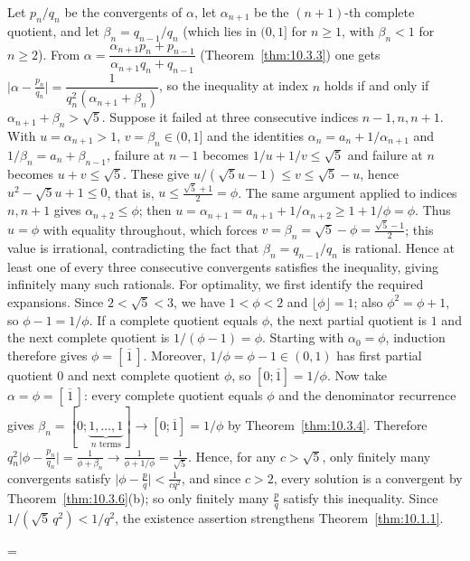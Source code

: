 \documentclass[11pt]{article}
\makeatletter
\theoremstyle{ntstyle}
\let\nt@closedisplay\]
\def\nt@guardedclose{\@ifnextchar\par{\nt@closeafterpar}{\@ifnextchar\end{\postdisplaypenalty\@M\nt@closedisplay}{\nt@closedisplay}}}
\def\nt@closeafterpar\par{\@ifnextchar\par{\nt@closeafterpar}{\@ifnextchar\end{\postdisplaypenalty\@M\nt@closedisplay\par}{\nt@closedisplay\par}}}
\renewenvironment{proof}[1][\proofname]{\par
  \pushQED{\qed}\normalfont\topsep\medskipamount\edef\nt@afterproof{\@endparpenalty=\the\@endparpenalty\relax}\@beginparpenalty\@M\@endparpenalty\@M\let\]\nt@guardedclose\trivlist\item[]\textit{#1\@addpunct{.}} \ignorespaces}{\ifvmode\addpenalty\@M\fi\popQED\nt@afterproof\endtrivlist\@endpefalse}
\makeatother
\begin{document}
\begin{proof} Let $p_n/q_n$ be the convergents of
	$\alpha$, let $\alpha_{n+1}$ be the $(n+1)$-th complete quotient, and let
	$\beta_n=q_{n-1}/q_n$ (which lies in $(0,1]$ for $n\ge1$, with
	$\beta_n<1$ for $n\ge2$). From
	$\alpha=\dfrac{\alpha_{n+1}p_n+p_{n-1}}{\alpha_{n+1}q_n+q_{n-1}}$
	(Theorem~\ref{thm:10.3.3}) one gets
	$\big|\alpha-\tfrac{p_n}{q_n}\big|=\dfrac{1}{q_n^2(\alpha_{n+1}+\beta_n)}$,
	so the inequality at index $n$ holds if and only if
	$\alpha_{n+1}+\beta_n>\sqrt{5}$. Suppose it failed at three consecutive
	indices $n-1,n,n+1$. With $u=\alpha_{n+1}>1$, $v=\beta_n\in(0,1]$
	and the identities $\alpha_n=a_n+1/\alpha_{n+1}$ and $1/\beta_n=a_n+\beta_{n-1}$,
	failure at $n-1$ becomes $1/u+1/v\le\sqrt{5}$ and failure at $n$
	becomes $u+v\le\sqrt{5}$. These give $u/(\sqrt{5}u-1)\le v\le\sqrt{5}-u$,
	hence $u^2-\sqrt{5}u+1\le0$, that is, $u\le\tfrac{\sqrt{5}+1}{2}=\phi$. The
	same argument applied to indices $n,n+1$ gives $\alpha_{n+2}\le\phi$;
	then $u=\alpha_{n+1}=a_{n+1}+1/\alpha_{n+2}\ge1+1/\phi=\phi$. Thus
	$u=\phi$ with equality throughout, which forces
	$v=\beta_n=\sqrt{5}-\phi=\tfrac{\sqrt{5}-1}{2}$; this value is irrational,
	contradicting the fact that $\beta_n=q_{n-1}/q_n$ is rational. Hence at least
	one of every three consecutive convergents satisfies the inequality,
	giving infinitely many such rationals. For optimality, we first identify the required expansions. Since
	$2<\sqrt5<3$, we have $1<\phi<2$ and $\lfloor\phi\rfloor=1$; also
	$\phi^2=\phi+1$, so $\phi-1=1/\phi$. If a complete quotient equals
	$\phi$, the next partial quotient is $1$ and the next complete quotient
	is $1/(\phi-1)=\phi$. Starting with $\alpha_0=\phi$, induction therefore
	gives $\phi=[\,\overline1\,]$. Moreover, $1/\phi=\phi-1\in(0,1)$ has
	first partial quotient $0$ and next complete quotient $\phi$, so
	$[0;\overline1]=1/\phi$. Now take
	$\alpha=\phi=[\,\overline1\,]$: every complete quotient equals $\phi$
	and the denominator recurrence gives
	$\beta_n=[0;\underbrace{1,\ldots,1}_{n\text{ terms}}]\to[0;\overline1]=1/\phi$
	by Theorem~\ref{thm:10.3.4}. Therefore
	$q_n^2\big|\phi-\tfrac{p_n}{q_n}\big|=\tfrac{1}{\phi+\beta_n}\to\tfrac{1}{\phi+1/\phi}=\tfrac{1}{\sqrt{5}}$.
	Hence, for any $c>\sqrt{5}$, only finitely many convergents satisfy
	$\big|\phi-\tfrac{p}{q}\big|<\tfrac{1}{cq^2}$, and since $c>2$, every
	solution is a convergent by Theorem~\ref{thm:10.3.6}(b); so only finitely many
	$\tfrac{p}{q}$ satisfy this inequality.
	Since $1/(\sqrt{5}\,q^2)<1/q^2$, the existence assertion strengthens
	Theorem~\ref{thm:10.1.1}.

\end{proof}
\end{document}
